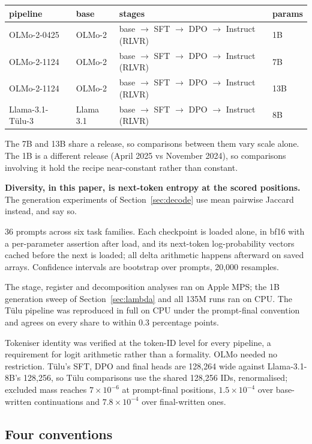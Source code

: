\documentclass[11pt]{article}
\begin{document}
\begin{center}
\begin{tabular}{llll}
\toprule
pipeline & base & stages & params \\
\midrule
OLMo-2-0425 & OLMo-2 & base $\to$ SFT $\to$ DPO $\to$ Instruct (RLVR) & 1B \\
OLMo-2-1124 & OLMo-2 & base $\to$ SFT $\to$ DPO $\to$ Instruct (RLVR) & 7B \\
OLMo-2-1124 & OLMo-2 & base $\to$ SFT $\to$ DPO $\to$ Instruct (RLVR) & 13B \\
Llama-3.1-T\"ulu-3 & Llama 3.1 & base $\to$ SFT $\to$ DPO $\to$ Instruct (RLVR) & 8B \\
\bottomrule
\end{tabular}
\end{center}

The 7B and 13B share a release, so comparisons between them vary scale alone. The
1B is a different release (April 2025 vs November 2024), so comparisons involving
it hold the recipe near-constant rather than constant.

\textbf{Diversity, in this paper, is next-token entropy at the scored positions.}
The generation experiments of Section~\ref{sec:decode} use mean pairwise Jaccard
instead, and say so.

36 prompts across six task families. Each checkpoint is loaded alone, in bf16 with
a per-parameter assertion after load, and its next-token log-probability vectors
cached before the next is loaded; all delta arithmetic happens afterward on saved
arrays. Confidence intervals are bootstrap over prompts, 20{,}000 resamples.

The stage, register and decomposition analyses ran on Apple MPS; the 1B generation
sweep of Section~\ref{sec:lambda} and all 135M runs ran on CPU. The T\"ulu pipeline
was reproduced in full on CPU under the prompt-final convention and agrees on every
share to within 0.3 percentage points.

Tokeniser identity was verified at the token-ID level for every pipeline, a
requirement for logit arithmetic rather than a formality. OLMo needed no
restriction. T\"ulu's SFT, DPO and final heads are 128{,}264 wide against
Llama-3.1-8B's 128{,}256, so T\"ulu comparisons use the shared 128{,}256 IDs,
renormalised; excluded mass reaches $7\times10^{-6}$ at prompt-final positions,
$1.5\times10^{-4}$ over base-written continuations and $7.8\times10^{-4}$ over
final-written ones.

\subsection{Four conventions}
\label{sec:fourconv}
\end{document}
